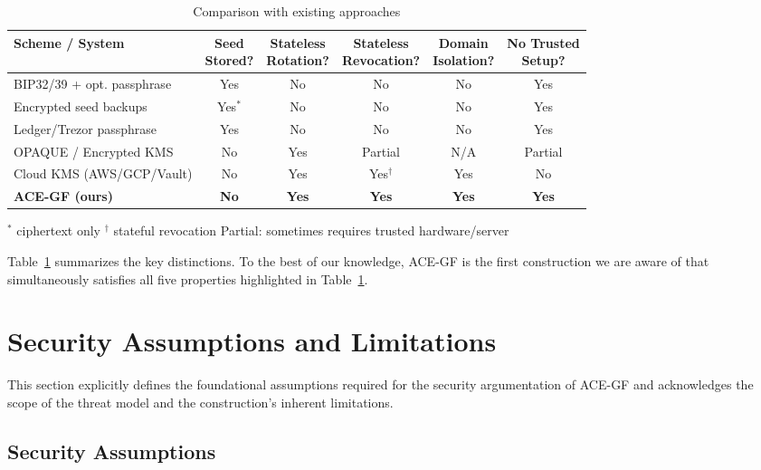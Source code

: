 \documentclass[12pt,a4paper]{article}
\begin{document}
  \setlength{\extrarowheight}{2pt}
  \begin{table}[t]
   \centering
   \caption{Comparison with existing approaches}
   \label{tab:comparison}
   \footnotesize
   \begin{tabular}{lccccc}
  \toprule
  Scheme / System &
  \makecell{Seed\\Stored?} &
  \makecell{Stateless\\Rotation?} &
  \makecell{Stateless\\Revocation?} &
  \makecell{Domain\\Isolation?} &
  \makecell{No Trusted\\Setup?} \\
  \midrule
  BIP32/39 + opt. passphrase  & Yes  & No  & No   & No  & Yes \\
  Encrypted seed backups    & Yes$^*$ & No  & No   & No  & Yes \\
  Ledger/Trezor passphrase   & Yes  & No  & No   & No  & Yes \\
  OPAQUE / Encrypted KMS    & No  & Yes  & Partial  & N/A & Partial \\
  Cloud KMS (AWS/GCP/Vault)  & No  & Yes  & Yes$^\dagger$ & Yes & No \\
  \textbf{ACE-GF (ours)}    & \textbf{No} & \textbf{Yes} & \textbf{Yes} & \textbf{Yes} & \textbf{Yes} \\
  \bottomrule
   \end{tabular}
   \vspace{4pt}
   \small
   $^*$ ciphertext only \quad
   $^\dagger$ stateful revocation \quad
   Partial: sometimes requires trusted hardware/server
  \end{table}

  Table~\ref{tab:comparison} summarizes the key distinctions. To the best of our knowledge, ACE-GF is the first construction we are aware of that simultaneously satisfies all five properties highlighted in Table~\ref{tab:comparison}.

  \section{Security Assumptions and Limitations}

  This section explicitly defines the foundational assumptions required for the security argumentation of ACE-GF and acknowledges the scope of the threat model and the construction's inherent limitations.

  \subsection{Security Assumptions}
\end{document}
